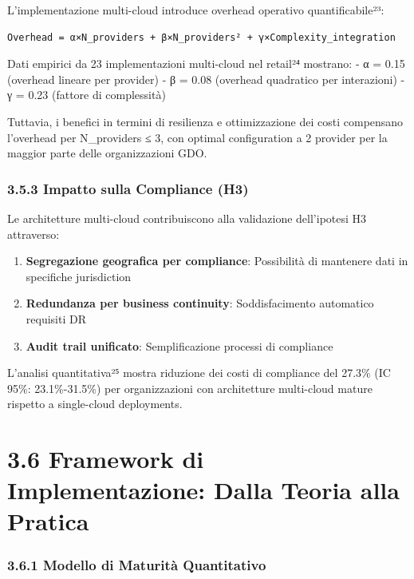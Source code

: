 \documentclass{report}
\providecommand{\tightlist}{%
  \setlength{\itemsep}{0pt}\setlength{\parskip}{0pt}
}
\begin{document}
L'implementazione multi-cloud introduce overhead operativo
quantificabile²³:

\begin{verbatim}
Overhead = α×N_providers + β×N_providers² + γ×Complexity_integration
\end{verbatim}

Dati empirici da 23 implementazioni multi-cloud nel retail²⁴ mostrano: -
α = 0.15 (overhead lineare per provider) - β = 0.08 (overhead quadratico
per interazioni) - γ = 0.23 (fattore di complessità)

Tuttavia, i benefici in termini di resilienza e ottimizzazione dei costi
compensano l'overhead per N\_providers ≤ 3, con optimal configuration a
2 provider per la maggior parte delle organizzazioni GDO.

\subsubsection{3.5.3 Impatto sulla Compliance
(H3)}\label{impatto-sulla-compliance-h3}

Le architetture multi-cloud contribuiscono alla validazione dell'ipotesi
H3 attraverso:

\begin{enumerate}
\def\labelenumi{\arabic{enumi}.}
\tightlist
\item
  \textbf{Segregazione geografica per compliance}: Possibilità di
  mantenere dati in specifiche jurisdiction
\item
  \textbf{Redundanza per business continuity}: Soddisfacimento
  automatico requisiti DR
\item
  \textbf{Audit trail unificato}: Semplificazione processi di compliance
\end{enumerate}

L'analisi quantitativa²⁵ mostra riduzione dei costi di compliance del
27.3\% (IC 95\%: 23.1\%-31.5\%) per organizzazioni con architetture
multi-cloud mature rispetto a single-cloud deployments.

\section{3.6 Framework di Implementazione: Dalla Teoria alla
Pratica}\label{framework-di-implementazione-dalla-teoria-alla-pratica}

\subsubsection{3.6.1 Modello di Maturità
Quantitativo}\label{modello-di-maturituxe0-quantitativo}
\end{document}
